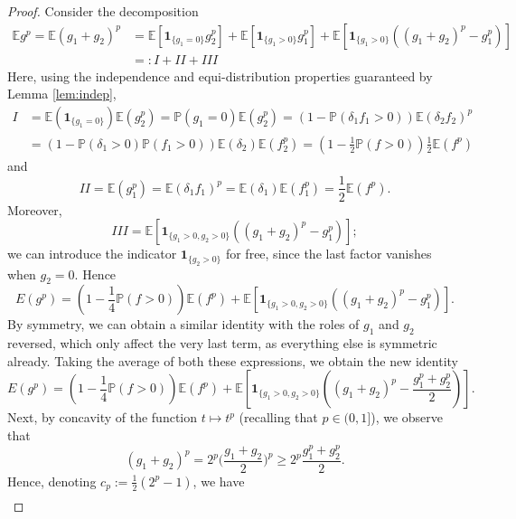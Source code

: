 \documentclass[11pt, reqno]{amsart}
\theoremstyle{definition}
\theoremstyle{remark}
\numberwithin{equation}{section}
\newcommand{\E}{\mathbb E}
\renewcommand{\P}{\mathbb P}
\newcommand{\one}{\mathbf{1}}
\begin{document}
\begin{proof}
Consider the decomposition
\begin{equation*}
\begin{split}
  \E g^p
  =\E(g_1+g_2)^p
  &=\E[\one_{\{g_1=0\}} g_2^p]
  +\E[\one_{\{g_1>0\}} g_1^p]
  +\E[\one_{\{g_1>0\}} ((g_1+g_2)^p-g_1^p)] \\
  &=:I+II+III
\end{split}
\end{equation*}
Here, using the independence and equi-distribution properties guaranteed by Lemma \ref{lem:indep},
\begin{equation*}
\begin{split}
  I
  &=\E(\one_{\{g_1=0\}})\E(g_2^p)
  =\P(g_1=0)\E(g_2^p)
  =(1-\P(\delta_1 f_1>0))\E(\delta_2f_2)^p \\
  &=(1-\P(\delta_1>0)\P(f_1>0))\E(\delta_2)\E(f_2^p)
  =(1-\frac12\P(f>0))\frac12\E(f^p)
\end{split}
\end{equation*}
and
\begin{equation*}
  II=\E(g_1^p)
  =\E(\delta_1 f_1)^p
  =\E(\delta_1)\E(f_1^p)
  =\frac12\E(f^p).
\end{equation*}
Moreover,
\begin{equation*}
  III=\E[\one_{\{g_1>0,g_2>0\}} ((g_1+g_2)^p-g_1^p)];
\end{equation*}
we can introduce the indicator $\one_{\{g_2>0\}}$ for free, since the last factor vanishes when $g_2=0$.
Hence
\begin{equation*}
  E(g^p)=(1-\frac14\P(f>0))\E(f^p)+\E[\one_{\{g_1>0,g_2>0\}} ((g_1+g_2)^p-g_1^p)].
\end{equation*}
By symmetry, we can obtain a similar identity with the roles of $g_1$ and $g_2$ reversed, which only affect the very last term, as everything else is symmetric already. Taking the average of both these expressions, we obtain the new identity
\begin{equation*}
  E(g^p)=(1-\frac14\P(f>0))\E(f^p)+\E[\one_{\{g_1>0,g_2>0\}} ((g_1+g_2)^p-\frac{g_1^p+g_2^p}{2})].
\end{equation*}
Next, by concavity of the function $t\mapsto t^p$ (recalling that $p\in(0,1]$), we observe that
\begin{equation*}
  (g_1+g_2)^p
  =2^p\Big(\frac{g_1+g_2}{2}\Big)^p
  \geq 2^p\frac{g_1^p+g_2^p}{2}.
\end{equation*}
Hence, denoting $c_p:=\frac12(2^p-1)$, we have
\begin{equation*}
\begin{split}

\end{split}
\end{equation*}
\end{proof}
\end{document}
